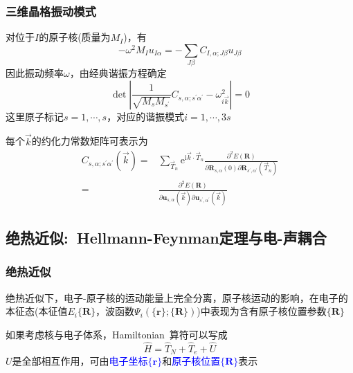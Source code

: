 {\frame
{
	\frametitle{三维晶格振动模式}
			对位于$I$的原子核(质量为$M_I$)，有
			\begin{displaymath}
				-\omega^2M_Iu_{I\alpha}=-\sum_{J\beta}C_{I,\alpha;J\beta}u_{J\beta}
			\end{displaymath}
			因此振动频率$\omega$，由经典谐振方程确定
			\begin{displaymath}
				\det\left|\frac1{\sqrt{M_sM_{s^{\prime}}}}C_{s,\alpha;s^{\prime}\alpha^{\prime}}-\omega_{i\vec k}^2\right|=0
			\end{displaymath}
			这里原子标记$s=1,\cdots,s$，对应的谐振模式$i=1,\cdots,3s$

			每个$\vec k$的约化力常数矩阵可表示为
			\begin{displaymath}
				\begin{aligned}
				C_{s,\alpha;s^{\prime}\alpha^{\prime}}(\vec k)=&\sum_{\vec T_n}\mathrm{e}^{\mathrm{i}\vec k\cdot\vec T_n}\frac{\partial^2 E(\mathbf{R})}{\partial\mathbf{R}_{s,\alpha}(0)\partial\mathbf{R}_{s^{\prime},\alpha^{\prime}}(\vec T_n)}\\
				=&\frac{\partial^2E(\mathbf{R})}{\partial\mathbf{u}_{s,\alpha}(\vec k)\partial\mathbf{u}_{s^{\prime},\alpha^{\prime}}(\vec k)} 
				\end{aligned}
			\end{displaymath}
}

\subsection{绝热近似:~\rm{Hellmann-Feynman}定理与电-声耦合}
\frame
{
	\frametitle{绝热近似}
	绝热近似下，电子-原子核的运动能量上完全分离，原子核运动的影响，在电子的本征态(本征值$E_i\{\mathbf{R}\}$，波函数$\Psi_i(\{\mathbf{r}\};\{\mathbf{R}\})$)中表现为含有原子核位置参数$\{\mathbf{R}\}$

	如果考虑核与电子体系，\textrm{Hamiltonian~}算符可以写成
	\begin{displaymath}
		\hat H=\hat T_N+\hat T_e+\hat U
	\end{displaymath}
	$U$是全部相互作用，可由\textcolor{blue}{电子坐标$\{\mathbf{r}\}$}和\textcolor{blue}{原子核位置$\{\mathbf{R}\}$}表示

}}

